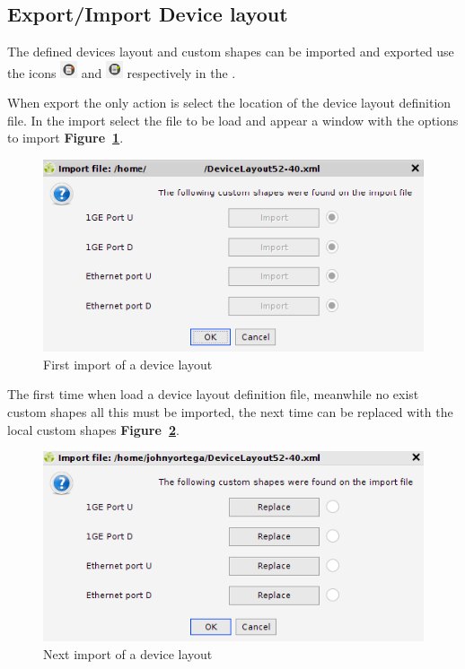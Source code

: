 \documentclass[a4paper]{article}
\begin{document}
	\subsection{Export/Import Device layout} \label{sec:import_export_device_layout}
	
	The defined devices layout and custom shapes can be imported and exported use the icons \includegraphics[width=0.5cm]{img/device_layout_export.png} and 	\includegraphics[width=0.5cm]{img/device_layout_import.png} respectively in the \textbf{}.
	
	When export the only action is select the location of the device layout definition file. In the import select the file to be load and appear a window with the options to import \textbf{Figure~\ref{fig:device_layout_first_import}}.
		
	\begin{figure}[h!]
		\centering
		\includegraphics[width=0.6\linewidth]{img/device_layout_first_import.png}
		\caption{First import of a device layout}
		\label{fig:device_layout_first_import}
	\end{figure}
	
	The first time when load a device layout definition file, meanwhile no exist custom shapes all this must be imported, the next time can be replaced with the local custom shapes \textbf{Figure~\ref{fig:device_layout_next_import}}.
	
	\begin{figure}[h!]
		\centering
		\includegraphics[width=0.6\linewidth]{img/device_layout_next_import.png}
		\caption{Next import of a device layout}
		\label{fig:device_layout_next_import}
	\end{figure}
	
\end{document}
